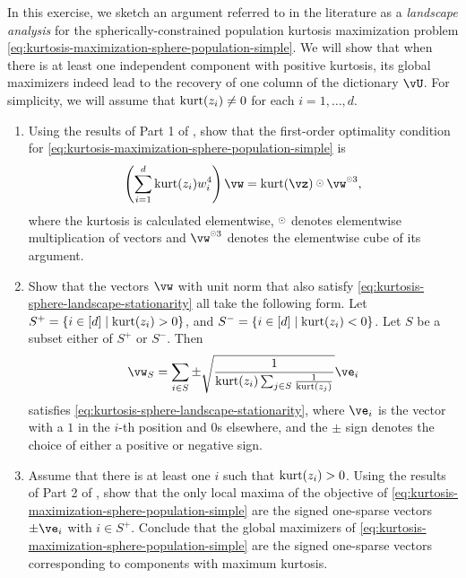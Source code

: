 \documentclass[../../book-main.tex]{subfiles}
\begin{document}
\begin{exercise}\label{exercise:kurtosis-sphere-landscape}
    In this exercise, we sketch an argument referred to in the literature as a \textit{landscape analysis} for the spherically-constrained population kurtosis maximization problem \eqref{eq:kurtosis-maximization-sphere-population-simple}. We will show that when there is at least one independent component with positive kurtosis, its 
    global maximizers indeed lead to the recovery of one column of the dictionary $\vU$.
    For simplicity, we will assume that $\mathop{\mathrm{kurt}}(z_i) \neq 0$ for each $i = 1, \dots, d$.
    \begin{enumerate}
        \item Using the results of Part 1 of , 
        show that the first-order optimality condition for \eqref{eq:kurtosis-maximization-sphere-population-simple} is
        \begin{equation}\label{eq:kurtosis-sphere-landscape-stationarity}
            \left(\sum_{i=1}^d \kurt(z_i) w_i^4 \right) 
            \vw = \kurt(\vz) \hada \vw^{\hada 3}, 
        \end{equation}
        where the kurtosis is calculated elementwise, $\hada$ denotes elementwise multiplication of vectors and $\vw^{\hada 3}$ denotes the elementwise cube of its argument.
        \item Show that the vectors $\vw$ with unit norm that also satisfy \eqref{eq:kurtosis-sphere-landscape-stationarity}
        all take the following form.
        Let $S^+ = \set{i \in [d] \given \kurt(z_i) > 0}$, and 
        $S^- = \set{i \in [d] \given \kurt(z_i) < 0}$.
        Let $S$ be a subset either of $S^+$ or $S^-$.
        Then 
        \begin{equation}\label{eq:kurtosis-sphere-landscape-cps}
            \vw_S = \sum_{i \in S} \pm \sqrt{\frac{1}{\kurt(z_i) \sum_{j \in S} \frac{1}{\kurt(z_j)}}} \ve_i
        \end{equation}
        satisfies \eqref{eq:kurtosis-sphere-landscape-stationarity},
        where $\ve_i$ is the vector with a $1$ in the $i$-th position and $0$s elsewhere, and the $\pm$ sign denotes the choice of either a positive or negative sign.
        \item Assume that there is at least one $i$ such that $\mathop{\mathrm{kurt}}(z_i) > 0$. Using the results of Part 2 of , show that the only local maxima of the objective of \eqref{eq:kurtosis-maximization-sphere-population-simple} are the signed one-sparse vectors $\pm \ve_i$ with $i \in S^+$. Conclude that the global maximizers of \eqref{eq:kurtosis-maximization-sphere-population-simple} are the signed one-sparse vectors corresponding to components with maximum kurtosis. %

\end{enumerate}
\end{exercise}
\end{document}
